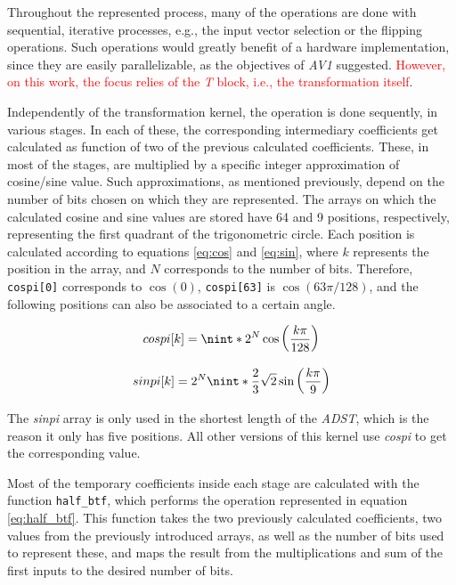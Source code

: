 Throughout the represented process, many of the operations are done with sequential, iterative processes, e.g., the input vector selection or the flipping operations. Such operations would greatly benefit of a hardware implementation, since they are easily parallelizable, as the objectives of \emph{AV1} suggested. \textcolor{red}{However, on this work, the focus relies of the \emph{T} block, i.e., the transformation itself}.

Independently of the transformation kernel, the operation is done sequently, in various stages. In each of these, the corresponding intermediary coefficients get calculated as function of two of the previous calculated coefficients. These, in most of the stages, are multiplied by a specific integer approximation of cosine/sine value. Such approximations, as mentioned previously, depend on the number of bits chosen on which they are represented. The arrays on which the calculated cosine and sine values are stored have 64 and 9 positions, respectively, representing the first quadrant of the trigonometric circle. Each position is calculated according to equations \ref{eq:cos} and \ref{eq:sin}, where $k$ represents the position in the array, and $N$ corresponds to the number of bits. Therefore, \verb|cospi[0]| corresponds to $\cos(0)$, \verb|cospi[63]| is $\cos(63\pi/128)$, and the following positions can also be associated to a certain angle.

\begin{equation} \label{eq:cos}
    cospi[k] = \nint*{2^{N}\cos\left(\frac{k\pi}{128}\right)}
\end{equation}

\begin{equation} \label{eq:sin}
    sinpi[k] = 2^{N}\nint*{\frac{2}{3}\sqrt{2}\sin\left(\frac{k\pi}{9}\right)}
\end{equation}

The \emph{sinpi} array is only used in the shortest length of the \emph{ADST}, which is the reason it only has five positions. All other versions of this kernel use \emph{cospi} to get the corresponding value.

Most of the temporary coefficients inside each stage are calculated with the function \verb|half_btf|, which performs the operation represented in equation \ref{eq:half_btf}. This function takes the two previously calculated coefficients, two values from the previously introduced arrays, as well as the number of bits used to represent these, and maps the result from the multiplications and sum of the first inputs to the desired number of bits.

